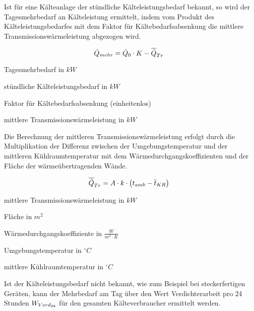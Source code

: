 Ist f\"ur eine K\"alteanlage der st\"undliche K\"alteleistungsbedarf bekannt, so
wird der Tagesmehrbedarf an K\"alteleistung ermittelt, indem vom Produkt des
K\"alteleistungsbedarfes mit dem Faktor f\"ur K\"altebedarfsabsenkung die
mittlere Transmissionswärmeleistung abgezogen wird.

\begin{equation}
	\pmehr = \pkalt \cdot K - \aptrans
\label{pmehr}
\end{equation}

\begin{description}[\dth]

	\item[$\pmehr$] Tagesmehrbedarf in $kW$
	\item[$\pkalt$] st\"undliche Kälteleistungsbedarf in $kW$
	\item[$K$] Faktor für Kältebedarfsabsenkung (einheitenlos)
	\item[$\aptrans$] mittlere Transmissionswärmeleistung in $kW$

\end{description}
\vspace{0.5cm}

Die Berechnung der mittleren Transmissionswärmeleistung erfolgt durch die
Multiplikation der Differenz zwischen der Umgebungstemperatur und der mittleren
Kühlraumtemperatur mit dem Wärmedurchgangskoeffizienten und der Fläche der
wärmeübertragenden Wände.

\begin{equation}
	\aptrans = A \cdot k \cdot \left( t_{amb} -
	\overline{t}_{KR} \right)
	\label{aptrans}
\end{equation}

\begin{description}[\dth]

	\item[$\aptrans$] mittlere Transmissionswärmeleistung in $kW$
	\item[$A$] Fläche in $m^2$
	\item[$k$] Wärmedurchgangskoeffiziente in $\frac{W}{m^2 \cdot K}$
	\item[$t_{amb}$] Umgebungstemperatur in $^{\circ}C$
	\item[$\overline{t}_{KR}$] mittlere Kühlraumtemperatur in
		$^{\circ}C$
\end{description}
\vspace{0.5cm}

Ist der Kälteleistungsbedarf nicht bekannt, wie zum Beispiel bei steckerfertigen
Geräten, kann der Mehrbedarf am Tag \"uber den Wert Verdichterarbeit pro 24
Stunden ${W}_{Verd_{24}}$ für den gesamten Kälteverbraucher ermittelt werden.

